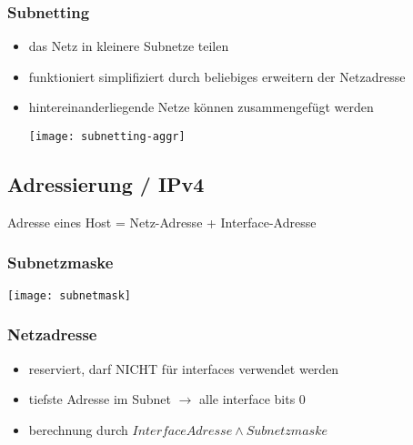 \subsubsection{Subnetting}
\begin{itemize}
    \item das Netz in kleinere Subnetze teilen
    \item funktioniert simplifiziert durch beliebiges erweitern der Netzadresse
    \item hintereinanderliegende Netze können zusammengefügt werden
          \begin{center}
              \texttt{[image: subnetting-aggr]}
          \end{center}
\end{itemize}








\subsection{Adressierung / IPv4}

Adresse eines Host = Netz-Adresse + Interface-Adresse

\subsubsection{Subnetzmaske}

\begin{center}
    \texttt{[image: subnetmask]}
\end{center}

\subsubsection{Netzadresse}

\begin{itemize}
    \item reserviert, darf NICHT für interfaces verwendet werden
    \item tiefste Adresse im Subnet $\rightarrow$ alle interface bits 0
    \item berechnung durch $Interface Adresse \land Subnetzmaske$
\end{itemize}

